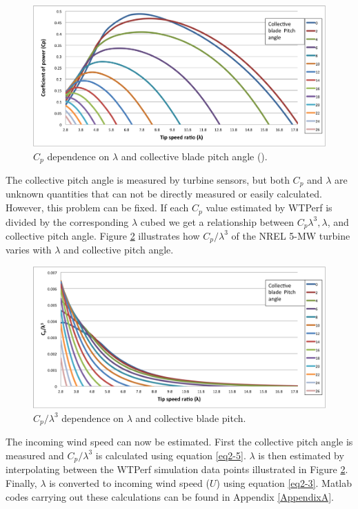\begin{figure}[htbp]
	\centering
		\includegraphics[width=\textwidth]{Figures/ch2Figures/fig2-13.png}
		
	\caption{$C_p$ dependence on $\lambda$ and collective blade pitch angle (\degree).}
	\label{fig2-13}
\end{figure}

The collective pitch angle is measured by turbine sensors, but both $C_p$ and $\lambda$ are unknown quantities that can not be directly measured or easily calculated. However, this problem can be fixed. If each $C_p$ value estimated by WTPerf is divided by the corresponding $\lambda$ cubed we get a relationship between $C_p\lambda^3, \lambda$, and collective pitch angle. Figure \ref{fig2-14}  illustrates how $C_p / \lambda^3$ of the NREL 5-MW turbine varies with $\lambda$ and collective pitch angle. 

\begin{figure}[htbp]
	\centering
		\includegraphics[width=\textwidth]{Figures/ch2Figures/fig2-14.png}
		
	\caption{$C_p / \lambda^3$ dependence on $\lambda$ and collective blade pitch.}
	\label{fig2-14}
\end{figure}

The incoming wind speed can now be estimated. First the collective pitch angle is measured and $C_p / \lambda^3$ is calculated using equation \ref{eq2-5}. $\lambda$ is then estimated by interpolating between the WTPerf simulation data points illustrated in Figure \ref{fig2-14}. Finally, $\lambda$ is converted to incoming wind speed ($U$) using equation \ref{eq2-3}. Matlab codes carrying out these calculations can be found in Appendix \ref{AppendixA}.


